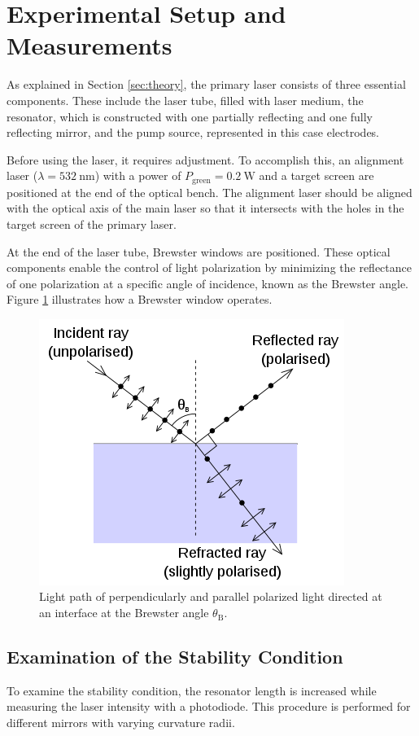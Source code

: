 \section{Experimental Setup and Measurements}

As explained in Section \ref{sec:theory}, the primary laser 
consists of three essential components. These 
include the laser tube, filled with laser medium, the resonator, 
which is constructed with one partially reflecting and one
fully reflecting mirror, and the pump source, represented in this 
case electrodes. 

Before using the laser, it requires adjustment. To accomplish this,
an alignment laser ($\lambda=\SI{532}{\nano\meter}$) with a power 
of $P_\text{green}=\SI{0.2}{\watt}$ and a target screen are positioned
at the end of the optical bench. The alignment laser should be aligned 
with the optical axis of the main laser so that it intersects with 
the holes in the target screen of the primary laser.  

At the end of the laser tube, Brewster windows are positioned. 
These optical components enable the control of light polarization
by minimizing the reflectance of one polarization at a specific
angle of incidence, known as the Brewster angle. Figure \ref{fig:brewster}
illustrates how a Brewster window operates.

\begin{figure}
    \centering
    \includegraphics[width=0.5\linewidth]{pictures/Brewster.png} %
    \caption{Light path of perpendicularly and parallel polarized light directed at an interface at the Brewster angle $\theta_\text{B}$. \cite{Brewster}}
    \label{fig:brewster}
\end{figure}

\subsection{Examination of the Stability Condition}
To examine the stability condition, the resonator length is increased
while measuring the laser intensity with a photodiode. This
procedure is performed for different mirrors with varying curvature 
radii.

